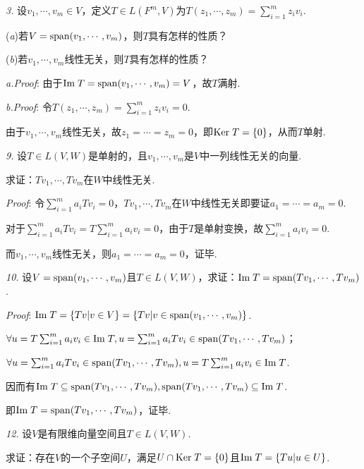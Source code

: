 \textit{3.}
设\(v_1,\cdots,v_m \in V\)，定义\(T \in L(F^m,V)\)为\(T(z_1,\cdots,z_m)=\sum_{i=1}^m z_iv_i\).

(\textit{a})若\(V=\mathrm{span} (v_1,\cdots,v_m)\)，则\(T\)具有怎样的性质？

(\textit{b})若\(v_1,\cdots,v_m\)线性无关，则\(T\)具有怎样的性质？

\textit{a.Proof}:
由于\(\mathrm{Im \;} T=\mathrm{span} (v_1,\cdots,v_m)=V\)，故\(T\)满射.

\textit{b.Proof}:
令\(T(z_1,\cdots,z_m)=\sum_{i=1}^m z_iv_i=0\).

由于\(v_1,\cdots,v_m\)线性无关，故\(z_1=\cdots=z_m=0\)，即\(\mathrm{Ker \;} T=\{0\}\)，从而\(T\)单射.

\hspace*{\fill}

\textit{9.}
设\(T\in L(V,W)\)是单射的，且\(v_1,\cdots,v_m\)是\(V\)中一列线性无关的向量.

求证：\(Tv_1,\cdots,Tv_m\)在\(W\)中线性无关.

\textit{Proof}:
令\(\sum_{i=1}^m a_iTv_i=0\)，\(Tv_1,\cdots,Tv_m\)在\(W\)中线性无关即要证\(a_1=\cdots=a_m=0\).

对于\(\sum_{i=1}^m a_iTv_i=T\sum_{i=1}^m a_iv_i=0\)，由于\(T\)是单射变换，故\(\sum_{i=1}^m a_iv_i=0\).

而\(v_1,\cdots,v_m\)线性无关，则\(a_1=\cdots=a_m=0\)，证毕.

\hspace*{\fill}

\textit{10.}
设\(V=\mathrm{span} (v_1,\cdots,v_m)\)且\(T\in L(V,W)\)，求证：\(\mathrm{Im \;} T=\mathrm{span} (Tv_1,\cdots,Tv_m)\).

\textit{Proof}:
\(\mathrm{Im \;} T=\{Tv|v\in V\}=\{Tv|v\in \mathrm{span}(v_1,\cdots,v_m)\}\).

\(\forall u=T\sum_{i=1}^m a_iv_i \in \mathrm{Im \;} T,u=\sum_{i=1}^m a_iTv_i \in \mathrm{span}(Tv_1,\cdots,Tv_m)\)；

\(\forall u=\sum_{i=1}^m a_iTv_i \in \mathrm{span}(Tv_1,\cdots,Tv_m),u=T\sum_{i=1}^m a_iv_i \in \mathrm{Im \;} T\).

因而有\(\mathrm{Im \;} T \subseteq \mathrm{span}(Tv_1,\cdots,Tv_m),\mathrm{span}(Tv_1,\cdots,Tv_m) \subseteq \mathrm{Im \;} T\).

即\(\mathrm{Im \;} T=\mathrm{span} (Tv_1,\cdots,Tv_m)\)，证毕.

\hspace*{\fill}

\textit{12.}
设\(V\)是有限维向量空间且\(T\in L(V,W)\).

求证：存在\(V\)的一个子空间\(U\)，满足\(U \cap \mathrm{Ker \;} T=\{0\}\)且\(\mathrm{Im \;} T=\{Tu|u\in U\}\).


